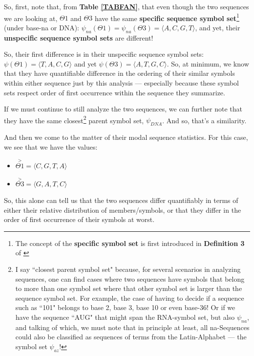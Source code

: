 \documentclass[a4paper, 18pt]{book} %
\begin{document}
So, first, note that, from \textbf{Table \ref{TABFAN}}, that even though the two sequences we are looking at, $\Theta1$ and $\Theta3$ have the same \textbf{specific sequence symbol set}\footnote{The concept of the \textbf{specific symbol set} is first introduced in \textbf{Definition 3} of \cite{ossipaper}} (under base-na or DNA): $\psi_{na}(\Theta1) = \psi_{na}(\Theta3) = \langle A, C, G, T \rangle$, and yet, their \textbf{unspecific sequence symbol sets} are different! 

So, their first difference is in their unspecific sequence symbol sets: $\psi(\Theta1) = \langle T, A, C, G\rangle$ and yet $\psi(\Theta3) = \langle A, T, G, C\rangle$. So, at minimum, we know that they have quantifiable difference in the ordering of their similar symbols within either sequence just by this analysis --- especially because these symbol sets respect order of first occurrence within the sequence they summarize.

If we must continue to still analyze the two sequences, we can further note that they have the same closest\footnote{I say ``closest parent symbol set" because, for several scenarios in analyzing sequences, one can find cases where two sequences have symbols that belong to more than one symbol set where that other symbol set is larger than the sequence symbol set. For example, the case of having to decide if a sequence such as ``101" belongs to base 2, base 3, base 10 or even base-36! Or if we have the sequence ``AUG" that might span the RNA-symbol set, but also $\psi_{na}$, and talking of which, we must note that in principle at least, all na-Sequences could also be classified as sequences of terms from the Latin-Alphabet --- the symbol set $\psi_{az}$!} parent symbol set, $\psi_{DNA}$. And so, that's a similarity.

And then we come to the matter of their modal sequence statistics. For this case, we see that we have the values: 

\begin{itemize}
\item $\overset{>}{\Theta1} = \langle C, G, T, A \rangle$
\item $\overset{>}{\Theta3} = \langle G, A, T, C \rangle$
\end{itemize}

So, this alone can tell us that the two sequences differ quantifiably in terms of either their relative distribution of members/symbols, or that they differ in the order of first occurrence of their symbols at worst.
\end{document}
